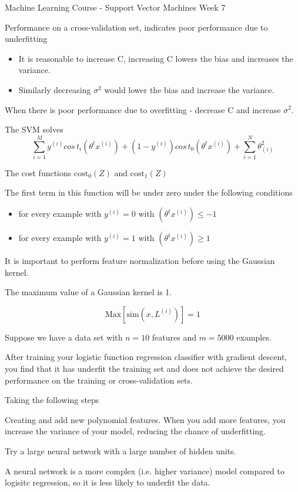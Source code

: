 Machine Learning Course - Support Vector Machines
Week 7


Performance on a cross-validation set, indicates poor performance due to underfitting

\begin{itemize}
\item It is reasonable to increase C, increasing C lowers the bias and increases the variance.
\item Similarly decreasing $\sigma^2$ would lower the bias and increase the variance.
\end{itemize}
When there is poor performance due to overfitting - decrease C and increase $\sigma^2$.


The SVM solves
\[
\sum^{M}_{i=1} y^{(i)} cos\,t_i (\theta^t x^{(i)}) + (1 - y^{(i)}) cos\,t_0 (\theta^t x^{(i)})+ \sum^{N}_{i=1} \theta^2_{(i)}
\]

The cost functions $\mbox{cost}_0(Z)$ and $\mbox{cost}_1(Z)$

The first term in this function will be under zero under the following conditions

\begin{itemize}
\item for every example with  $y^{(i)} = 0$ with $(\theta^t x^{(i)}) \leq  - 1$
\item for every example with  $y^{(i)} = 1$ with $(\theta^t x^{(i)}) \geq  1$
\end{itemize}

It is important to perform feature normalization before using the Gaussian kernel.

The maximum value of a Gaussian kernel is 1.

\[ \mbox{Max} [ \mbox{sim}(x, L^{(i)}) ] = 1 \] 

Suppose we have a data set with $n=10$ features and $m=5000$ examples.

After training your logistic function regression classifier with gradient descent, you find that it has underfit the training
set and does not achieve the desired performance on the training or cross-validation sets.

Taking the following steps


Creating and add new polynomial features. When you add more features, you increase the variance of your model, reducing
the chance of underfitting.

Try a large neural network with a large number of hidden units.

A neural network is a more complex (i.e. higher variance) model compared to  logisitc regression, so it is less likely to underfit the data.
